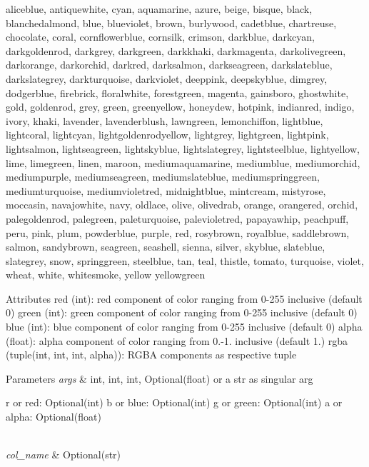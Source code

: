 aliceblue, antiquewhite, cyan, aquamarine, azure, beige, bisque, black, blanchedalmond, blue, blueviolet, brown, burlywood, cadetblue, chartreuse, chocolate, coral, cornflowerblue, cornsilk, crimson, darkblue, darkcyan, darkgoldenrod, darkgrey, darkgreen, darkkhaki, darkmagenta, darkolivegreen, darkorange, darkorchid, darkred, darksalmon, darkseagreen, darkslateblue, darkslategrey, darkturquoise, darkviolet, deeppink, deepskyblue, dimgrey, dodgerblue, firebrick, floralwhite, forestgreen, magenta, gainsboro, ghostwhite, gold, goldenrod, grey, green, greenyellow, honeydew, hotpink, indianred, indigo, ivory, khaki, lavender, lavenderblush, lawngreen, lemonchiffon, lightblue, lightcoral, lightcyan, lightgoldenrodyellow, lightgrey, lightgreen, lightpink, lightsalmon, lightseagreen, lightskyblue, lightslategrey, lightsteelblue, lightyellow, lime, limegreen, linen, maroon, mediumaquamarine, mediumblue, mediumorchid, mediumpurple, mediumseagreen, mediumslateblue, mediumspringgreen, mediumturquoise, mediumvioletred, midnightblue, mintcream, mistyrose, moccasin, navajowhite, navy, oldlace, olive, olivedrab, orange, orangered, orchid, palegoldenrod, palegreen, paleturquoise, palevioletred, papayawhip, peachpuff, peru, pink, plum, powderblue, purple, red, rosybrown, royalblue, saddlebrown, salmon, sandybrown, seagreen, seashell, sienna, silver, skyblue, slateblue, slategrey, snow, springgreen, steelblue, tan, teal, thistle, tomato, turquoise, violet, wheat, white, whitesmoke, yellow yellowgreen

Attributes red (int)\+: red component of color ranging from 0-\/255 inclusive (default 0) green (int)\+: green component of color ranging from 0-\/255 inclusive (default 0) blue (int)\+: blue component of color ranging from 0-\/255 inclusive (default 0) alpha (float)\+: alpha component of color ranging from 0.-\/1. inclusive (default 1.) rgba (tuple(int, int, int, alpha))\+: R\+G\+BA components as respective tuple


\begin{DoxyParams}{Parameters}
{\em args} & int, int, int, Optional(float) or a str as singular arg \begin{DoxyVerb}       r or red: Optional(int)
       b or blue: Optional(int)
       g or green: Optional(int)
       a or alpha: Optional(float)
\end{DoxyVerb}
 \\
\hline
{\em col\+\_\+name} & Optional(str)\\
\hline
\end{DoxyParams}

